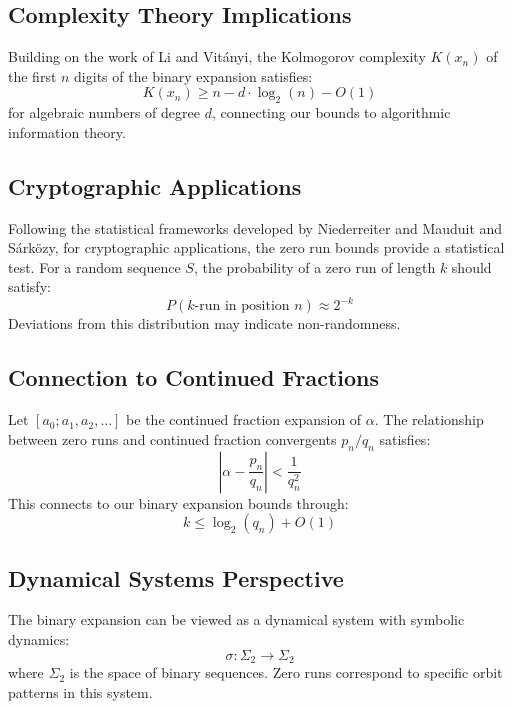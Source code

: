 \subsection{Complexity Theory Implications}
Building on the work of Li and Vitányi, the Kolmogorov complexity 
$K(x_n)$ of the first $n$ digits of the binary expansion satisfies:
\begin{equation}
    K(x_n) \geq n - d \cdot \log_2(n) - O(1)
\end{equation}
for algebraic numbers of degree $d$, connecting our bounds to algorithmic information theory.

\subsection{Cryptographic Applications}
Following the statistical frameworks developed by Niederreiter and 
Mauduit and Sárközy, for cryptographic applications, the zero run bounds 
provide a statistical test. For a random sequence $S$, the probability of a zero run of 
length $k$ should satisfy:
\begin{equation}
    P(k\text{-run in position }n) \approx 2^{-k}
\end{equation}
Deviations from this distribution may indicate non-randomness.

\subsection{Connection to Continued Fractions}
Let $[a_0; a_1, a_2, \ldots]$ be the continued fraction expansion of $\alpha$. The relationship between 
zero runs and continued fraction convergents $p_n/q_n$ satisfies:
\begin{equation}
    \left|\alpha - \frac{p_n}{q_n}\right| < \frac{1}{q_n^2}
\end{equation}
This connects to our binary expansion bounds through:
\begin{equation}
    k \leq \log_2(q_n) + O(1)
\end{equation}

\subsection{Dynamical Systems Perspective}
The binary expansion can be viewed as a dynamical system with symbolic dynamics:
\begin{equation}
    \sigma: \Sigma_2 \to \Sigma_2
\end{equation}
where $\Sigma_2$ is the space of binary sequences. Zero runs correspond to specific orbit 
patterns in this system.

